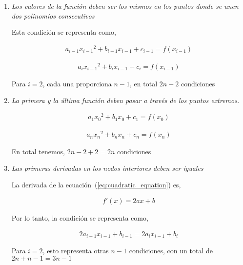 \documentclass[conference]{IEEEtran}
\begin{document}
\begin{enumerate}
	\item \textit{Los valores de la función deben ser los mismos en los puntos
		      donde se unen dos polinomios consecutivos}

	      Esta condición se representa como,

	      \begin{align}
		      a_{i - 1}{x_{i - 1}}^{2} + b_{i - 1}x_{i - 1} + c_{i - 1} = f(x_{i - 1})
		      \label{eq:18.29}
	      \end{align}

	      \begin{align}
		      a_{i}{x_{i - 1}}^{2} + b_{i}x_{i - 1} + c_{i} = f(x_{i - 1})
		      \label{eq:18.30}
	      \end{align}

	      Para $i = 2$, cada una proporciona $n - 1$, en total $2n - 2$ condiciones

	\item \textit{La primera y la última función deben pasar a través
		      de los puntos extremos.}

	      \begin{align}
		      a_{1}{x_{0}}^{2} + b_{1}x_{0} + c_{1} = f(x_{0})
		      \label{eq:18.31}
	      \end{align}

	      \begin{align}
		      a_{n}{x_{n}}^{2} + b_{n}x_{n} + c_{n} = f(x_{n})
		      \label{eq:18.32}
	      \end{align}

	      En total tenemos, $2n - 2 + 2 = 2n$ condiciones

	\item \textit{Las primeras derivadas en los nodos interiores deben
		      ser iguales}

	      La derivada de la ecuación~(\ref{eq:cuadratic_equation}) es,

	      \begin{align*}
		      f'(x) = 2ax + b
	      \end{align*}

	      Por lo tanto, la condición se representa como,

	      \begin{align}
		      2a_{i - 1}x_{i - 1} + b_{i - 1} = 2a_{i}x_{i - 1} + b_{i}
		      \label{eq:18.33}
	      \end{align}

	      Para $i = 2$, esto representa otras $n - 1$ condiciones, con
	      un total de $2n + n - 1 = 3n - 1$


\end{enumerate}
\end{document}
